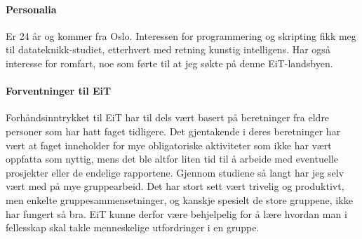 
\paragraph{Personalia}
Er 24 år og kommer fra Oslo.
Interessen for programmering og skripting fikk meg til datateknikk-studiet, etterhvert med retning kunstig intelligens.
Har også interesse for romfart, noe som førte til at jeg søkte på denne EiT-landsbyen.

\paragraph{Forventninger til EiT}
Forhåndsinntrykket til EiT har til dels vært basert på beretninger fra eldre personer som har hatt faget tidligere.
Det gjentakende i deres beretninger har vært at faget inneholder for mye obligatoriske aktiviteter som ikke har vært oppfatta som nyttig, mens det ble altfor liten tid til å arbeide med eventuelle prosjekter eller de endelige rapportene.
Gjennom studiene så langt har jeg selv vært med på mye gruppearbeid.
Det har stort sett vært trivelig og produktivt, men enkelte gruppesammensetninger, og kanskje spesielt de store gruppene, ikke har fungert så bra.
EiT kunne derfor være behjelpelig for å lære hvordan man i fellesskap skal takle menneskelige utfordringer i en gruppe.
